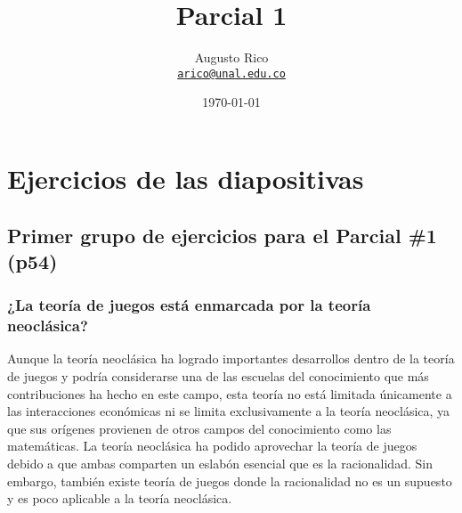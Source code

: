 \documentclass[12pt]{article}
\title{Parcial 1
}
\author{Augusto Rico\\%
    \href{mailto:arico@unal.edu.co}{\texttt{arico@unal.edu.co}} %
    }
\date{\today}
\begin{document}
\maketitle

\section{Ejercicios de las diapositivas}
\subsection{Primer grupo de ejercicios para el Parcial \#1 (p54) }
\subsubsection{¿La teoría de juegos está enmarcada por la teoría neoclásica?}

\begin{flushleft}
    Aunque la teoría neoclásica ha logrado importantes desarrollos dentro de la teoría de juegos y podría considerarse una de las escuelas del conocimiento que más contribuciones ha hecho en este campo, esta teoría no está limitada únicamente a las interacciones económicas ni se limita exclusivamente a la teoría neoclásica, ya que sus orígenes provienen de otros campos del conocimiento como las matemáticas. La teoría neoclásica ha podido aprovechar la teoría de juegos debido a que ambas comparten un eslabón esencial que es la racionalidad. Sin embargo, también existe teoría de juegos donde la racionalidad no es un supuesto y es poco aplicable a la teoría neoclásica.
\end{flushleft}
\end{document}

